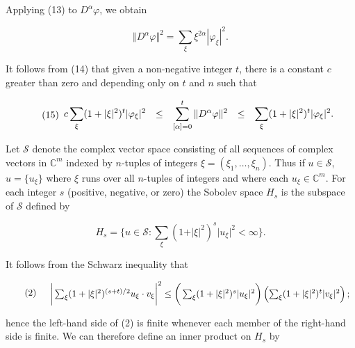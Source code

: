 Applying (13) to  $ D^{\alpha}\varphi $, we obtain

\begin{equation}
\tag{14}\label{eq:6.16:14}
\Vert D^{\alpha}\varphi\Vert^{2}=\sum_{\xi}\xi^{2\alpha}|\varphi_{\xi}|^{2}.
\end{equation}

It follows from (14) that given a non-negative integer $t$, there is a constant $c$ greater than zero and depending only on $t$ and $n$ such that

\begin{equation}
\tag{15}\label{eq:6.16:15}
\begin{array}{r l r l r}{c\displaystyle\sum_{\xi}(1+\vert\xi\vert^{2})^{t}\vert\varphi_{\xi}\vert^{2}}&{\leq}&{\displaystyle\sum_{[\alpha]=0}^{t}\Vert D^{\alpha}\varphi\Vert^{2}}&{\leq}&{\displaystyle\sum_{\xi}(1+\vert\xi\vert^{2})^{t}\vert\varphi_{\xi}\vert^{2}.}\end{array}
\end{equation}

\label{thm:6.17} Let  $ \mathcal{S} $ denote the complex vector space consisting of all sequences of complex vectors in  $ \mathbb{C}^m $ indexed by  $ n $-tuples of integers  $ \xi = (\xi_1, \ldots, \xi_n) $. Thus if  $ u \in \mathcal{S} $,  $ u = \{u_\xi\} $ where  $ \xi $ runs over all  $ n $-tuples of integers and where each  $ u_\xi \in \mathbb{C}^m $. For each integer  $ s $ (positive, negative, or zero) the Sobolev space  $ H_s $ is the subspace of  $ \mathcal{S} $ defined by

\begin{equation}
\tag{1}\label{eq:6.17:1}
H_{s}=\Big\{u\in\mathcal{S}\colon\sum_{\xi}(1+\vert\xi\vert^{2})^{s}\vert u_{\xi}\vert^{2}<\infty\Big\}.
\end{equation}

It follows from the Schwarz inequality that 

\begin{equation}
\tag{2}\label{eq:6.17:2}
\begin{array}{r l}&{\bigg|\sum_{\xi}(1+\vert\xi\vert^{2})^{(s+t)/2}u_{\xi}\cdot v_{\xi}\bigg\rvert^{2}\leq\bigg(\sum_{\xi}(1+\vert\xi\vert^{2})^{s}\vert u_{\xi}\vert^{2}\bigg)\left(\sum_{\xi}(1+\vert\xi\vert^{2})^{t}\vert v_{\xi}\vert^{2}\right);}\end{array}
\end{equation}

hence the left-hand side of (2) is finite whenever each member of the right-hand side is finite. We can therefore define an inner product on  $ H_{s} $ by

